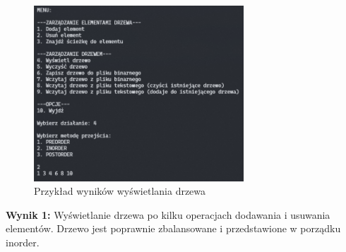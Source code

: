 \begin{figure}[ht]
	\centering
	\includegraphics[width=0.7\textwidth]{rys/display_bst.png}
	\caption{Przykład wyników wyświetlania drzewa}
\end{figure}

\textbf{Wynik 1:} Wyświetlanie drzewa po kilku operacjach dodawania i usuwania elementów. Drzewo jest poprawnie zbalansowane i przedstawione w porządku inorder.
